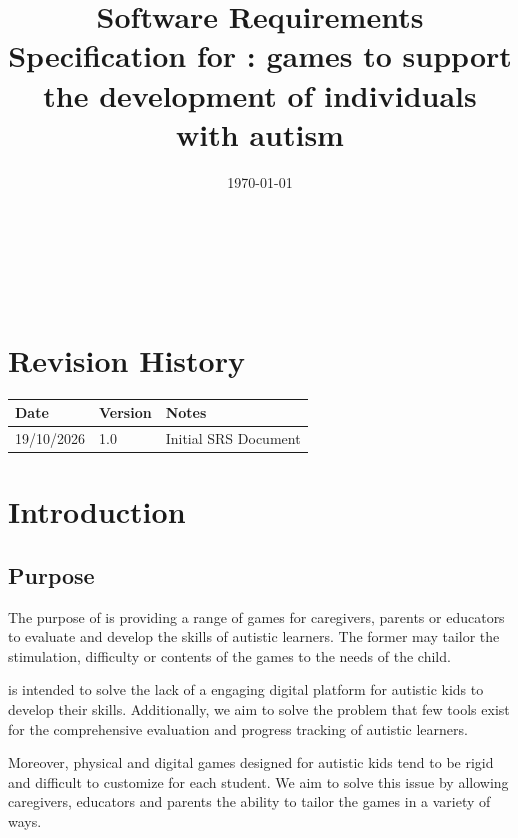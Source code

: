 \documentclass[12pt]{article}
\begin{document}
\title{Software Requirements Specification for \progname: games to support the development of individuals with autism} 
\author{\authname}
\date{\today}
	
\maketitle

~\newpage


\tableofcontents

~\newpage

\section*{Revision History}

\begin{tabularx}{\textwidth}{p{3cm}p{2cm}X}
\toprule {\bf Date} & {\bf Version} & {\bf Notes}\\
\midrule
19/10/2026 & 1.0 & Initial SRS Document\\
\bottomrule
\end{tabularx}

\newpage


\section{Introduction} 

\subsection{Purpose}

The purpose of \progname{} is providing a range of games for caregivers, parents or educators to evaluate and develop the skills of autistic learners. The former may tailor the stimulation, difficulty or contents of the games to the needs of the child. 

\progname{} is intended to solve the lack of a engaging digital platform for autistic kids to develop their skills. Additionally, we aim to solve the problem that few tools exist for the comprehensive evaluation and progress tracking of autistic learners.

Moreover, physical and digital games designed for autistic kids tend to be rigid and difficult to customize for each student. We aim to solve this issue by allowing caregivers, educators and parents the ability to tailor the games in a variety of ways. 
\end{document}
